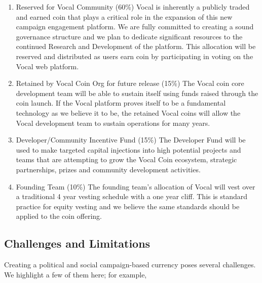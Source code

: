 \documentclass[conference]{IEEEtran}
\begin{document}
    \begin{enumerate}
        \item Reserved for Vocal Community (60\%)
       Vocal is inherently a publicly traded and earned coin that plays a critical role in the expansion of this new campaign engagement platform. We are fully committed to creating a sound governance structure and we plan to dedicate significant resources to the continued Research and Development of the platform. This allocation will be reserved and distributed as users earn coin by participating in voting on the Vocal web platform.
        \item Retained by Vocal Coin Org for future release (15\%)
        The Vocal coin core development team will be able to sustain itself using funds raised through the coin launch. If the Vocal platform proves itself to be a fundamental technology as we believe it to be, the retained Vocal coins will allow the Vocal development team to sustain operations for many years.
        \item Developer/Community Incentive Fund (15\%)
        The Developer Fund will be used to make targeted capital injections into high potential projects and teams that are attempting to grow the Vocal Coin ecosystem, strategic partnerships, prizes and community development activities.
        \item Founding Team (10\%)
        The founding team’s allocation of Vocal will vest over a traditional 4 year vesting schedule with a one year cliff. This is standard practice for equity vesting and we believe the same standards should be applied to the coin offering.
    \end{enumerate}
    


    \subsection{Challenges and Limitations}
    Creating a political and social campaign-based currency poses several challenges. We highlight a few of them here; for example,
\end{document}
